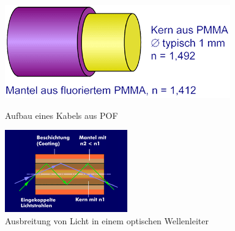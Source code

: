 \begin{figure}[h]
    \begin{center}
        \begin{minipage}[t]{0.4\textwidth}
            \begin{center}
                \includegraphics[height=0.4\textwidth]{Bilder/Optische_Wellenleiter_Die_Polymer_Optische_Faser/Funktionsweise/pofprinzip.png}
                \caption[Aufbau eines Kabels aus POF \newline \url{http://www.pofac.fh-nuernberg.de/pofac/de/was_sind_pof/images/pof_prinzip.png}]{Aufbau eines Kabels aus POF}
                \label{fig:pofprinzip}
            \end{center}
        \end{minipage}
        \hspace{0.025\textwidth}
        \begin{minipage}[t]{0.4\textwidth}
            \begin{center}
                \includegraphics[height=0.1\textheight]{Bilder/Optische_Wellenleiter_Die_Polymer_Optische_Faser/Funktionsweise/poflichtausbreitung.png}
                \caption[Ausbreitung von Licht in einem optischen Wellenleiter \newline \url{http://www.itwissen.info/bilder-klein/lwl-mit-verschiedenen-moden.png}]{Ausbreitung von Licht in einem optischen Wellenleiter} %
                \label{fig:poflichtausbreitung}
            \end{center}
        \end{minipage}
    \end{center}
\end{figure}

